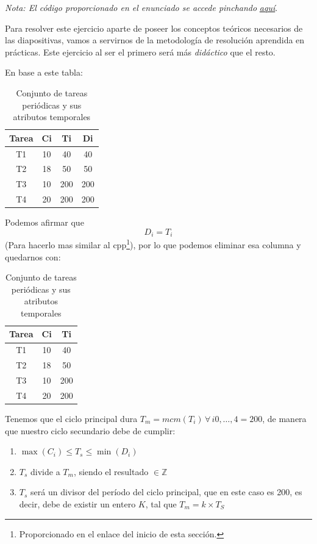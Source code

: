 \documentclass[a4paper,12pt]{article}
\begin{document}
\begin{tcolorbox}[colback=gray!5!white,colframe=gray!75!black]
    \textit{Nota: El código proporcionado en el enunciado se accede pinchando }\href{https://github.com/ElblogdeIsmael/ElblogdeIsmael.github.io/blob/main/Subjects/Third/SCD/Practicas/Practicas_Resueltas/Practica4/scd-p4-fuentes/SOLUCION_ACTIVIDAD_CLASE/ejecutivo2.cpp}{\textit{aquí}}.
\end{tcolorbox}

Para resolver este ejercicio aparte de poseer los conceptos teóricos necesarios de las diapositivas, vamos a servirnos de la metodología de resolución aprendida en prácticas. Este ejercicio al ser el primero será más \textit{didáctico} que el resto.

En base a este tabla:

\begin{table}[H]
    \centering
    \begin{tabular}{|c|c|c|c|}
    \hline
    \textbf{Tarea} & \textbf{Ci} & \textbf{Ti} & \textbf{Di} \\ \hline
    T1 & 10 & 40 & 40 \\ \hline
    T2 & 18 & 50 & 50 \\ \hline
    T3 & 10 & 200 & 200 \\ \hline
    T4 & 20 & 200 & 200 \\ \hline
    \end{tabular}
    \caption{Conjunto de tareas periódicas y sus atributos temporales}
\end{table}

Podemos afirmar que \[D_i = T_i \] (Para hacerlo mas similar al cpp\footnote{Proporcionado en el enlace del inicio de esta sección.}),  por lo que podemos eliminar esa columna y quedarnos con:

\begin{table}[H]
    \centering
    \begin{tabular}{|c|c|c|}
    \hline
    \textbf{Tarea} & \textbf{Ci} & \textbf{Ti} \\ \hline
    T1 & 10 & 40 \\ \hline
    T2 & 18 & 50 \\ \hline
    T3 & 10 & 200 \\ \hline
    T4 & 20 & 200 \\ \hline
    \end{tabular}
    \caption{Conjunto de tareas periódicas y sus atributos temporales}
\end{table}

Tenemos que el ciclo principal dura $T_m = mcm(T_i)\,\forall \, i 0,\ldots, 4 = 200$, de manera que nuestro ciclo secundario debe de cumplir:
\begin{enumerate}
    \item $\max(C_i) \leq T_s \leq \min(D_i)$
    \item $T_s$ divide a $T_m$, siendo el resultado $\in \mathbb{Z}$
    \item $T_s$ será un divisor del período del ciclo principal, que en este caso es 200, es decir, debe de existir un entero $K$, tal que $T_m = k \times T_S$
\end{enumerate}
\end{document}
